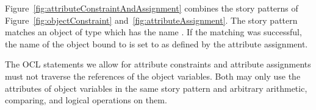Figure~\ref{fig:attributeConstraintAndAssignment} combines the story patterns of Figure~\ref{fig:objectConstraint} and~\ref{fig:attributeAssignment}. The story pattern matches an object of type  which has the name . If the matching was successful, the name of the object bound to  is set to  as defined by the attribute assignment.

The OCL statements we allow for attribute constraints and attribute assignments must not traverse the references of the object variables.
Both may only use the attributes of object variables in the same story pattern and arbitrary arithmetic, comparing, and logical operations on them. 





